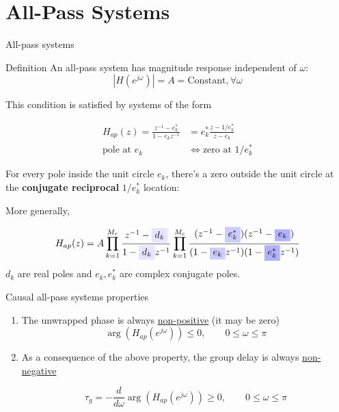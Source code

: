 \documentclass[10pt, handout]{beamer}
\begin{document}
\section{All-Pass Systems}
\begin{frame}{All-pass systems}

\begin{block}{Definition}
	An all-pass system has magnitude response independent of $\omega$:
	\begin{equation*}
	|H(e^{j\omega})| = A = \text{Constant}, \forall \omega
	\end{equation*}
\end{block}

This condition is satisfied by systems of the form

\begin{align*}
H_{ap}(z) = \frac{z^{-1} - e_k^*}{1 - e_kz^{-1}} &= e_k^*\frac{z - 1/e_k^*}{z - e_k} \\
\text{pole at $e_k$} &\Longleftrightarrow \text{zero at $1/e_k^*$} 
\end{align*}

For every pole inside the unit circle $e_k$, there's a zero outside the unit circle at the \textbf{conjugate reciprocal} $1/e_k^*$ location:

More generally,

\begin{align*}
H_{ap}(z) = A\prod_{k = 1}^{M_r}\frac{z^{-1} - \tikz[baseline]{\node[fill=blue!10,anchor=base] {$d_k$};}}{1 - \tikz[baseline]{\node[fill=blue!10,anchor=base] {$d_k$};}z^{-1}}\prod_{k = 1}^{M_c}\frac{(z^{-1} - \tikz[baseline]{\node[fill=blue!20,anchor=base] {$e^*_k$};})(z^{-1} - \tikz[baseline]{\node[fill=blue!30,anchor=base] {$e_k$};})}{(1 - \tikz[baseline]{\node[fill=blue!20,anchor=base] {$e_k$};}z^{-1})(1 - \tikz[baseline]{\node[fill=blue!30,anchor=base] {$e^*_k$};}z^{-1})}
\end{align*}
$d_k$ are real poles and $e_k, e^*_k$ are complex conjugate poles.
\end{frame}

\begin{frame}{Causal all-pass systems properties}
\begin{enumerate}
	\item The unwrapped phase is always \underline{non-positive} (it may be zero)
	\begin{equation*}
	\arg(H_{ap}(e^{j\omega})) \leq 0, \qquad 0 \leq \omega\leq\pi
	\end{equation*}
	\item As a consequence of the above property, the group delay is always \underline{non-negative}
	
	\begin{equation*}
	\tau_g = -\dfrac{d}{d\omega}\arg(H_{ap}(e^{j\omega})) \geq 0, \qquad 0 \leq \omega\leq\pi
	\end{equation*} 
	
\end{enumerate}
\end{frame}
\end{document}
